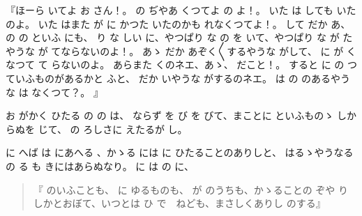 『ほーら
いてよ
お
さん！。
の
ぢやあ
くつてよ
の
よ！。
いた
は
しても
いたのよ。
いた
はまた
が
に
かつた
いたのかも
れなくつてよ！。
して
だか
あ、
の
の
といふ
にも、
り
な
しい
に、やつぱり
な
の
を
いて、やつぱり
な
が
たやうな
が
てならないのよ！。
あゝ
だか
あぞく〳〵するやうな
がして、
に
が
くなつて
て
らないのよ。
あらまた
くのネエ、あゝ、
だこと！。
すると
に
の
つていふものがあるかと
ふと、
だか
いやうな
がするのネエ。
は
の
のあるやうな
は
なくつて？。
』

お
がかく
ひたる
の
の
は、
ならず
を
び
を
びて、まことに
といふものゝ
しからぬを
じて、
の
ろしさに
えたるが
し。

に
へば
は
にあへる
、かゝる
には
に
ひたることのありしと、
はるゝやうなる
の
る
も
きにはあらぬなり。
に
は
の
に、

\begin{quote}
『
のいふことも、
に
ゆるものも、
が
のうちも、かゝることの
ぞや
りしかとおぼて、いつとは
ひ
で　ねども、まさしくありし
のする』
\end{quote}


